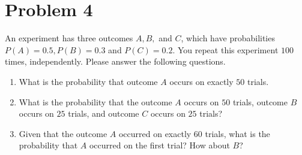 \section{Problem 4}
An experiment has three outcomes $A, B,$ and $C$, which have probabilities $P(A)=0.5, P(B)=0.3$ and $P(C)=0.2$. You repeat this experiment $100$ times, independently. Please answer the following questions.
\begin{enumerate}[4a.]
	\item What is the probability that outcome $A$ occurs on exactly $50$ trials.
	\item What is the probability that the outcome $A$ occurs on $50$ trials, outcome $B$ occurs on $25$ trials, and outcome $C$ occurs on $25$ trials?
	\item Given that the outcome $A$ occurred on exactly $60$ trials, what is the probability that $A$ occurred on the first trial? How about $B$?
\end{enumerate}

